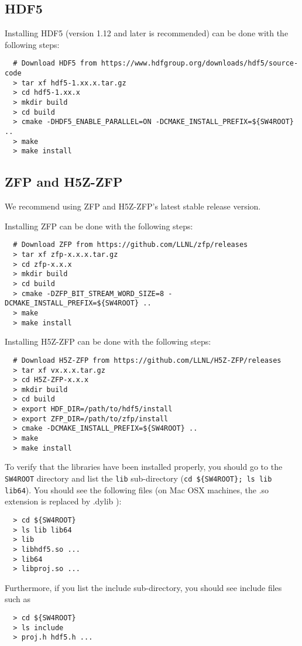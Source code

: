 \documentclass[11pt]{article}
\begin{document}
\subsection{HDF5}
Installing HDF5 (version 1.12 and later is recommended) can be done with the following steps:
\begin{verbatim}
  # Download HDF5 from https://www.hdfgroup.org/downloads/hdf5/source-code
  > tar xf hdf5-1.xx.x.tar.gz
  > cd hdf5-1.xx.x
  > mkdir build
  > cd build
  > cmake -DHDF5_ENABLE_PARALLEL=ON -DCMAKE_INSTALL_PREFIX=${SW4ROOT} ..
  > make
  > make install
\end{verbatim}

\subsection{ZFP and H5Z-ZFP}
We recommend using ZFP and H5Z-ZFP's latest stable release version. 

Installing ZFP can be done with the following steps:
\begin{verbatim}
  # Download ZFP from https://github.com/LLNL/zfp/releases
  > tar xf zfp-x.x.x.tar.gz
  > cd zfp-x.x.x
  > mkdir build
  > cd build
  > cmake -DZFP_BIT_STREAM_WORD_SIZE=8 -DCMAKE_INSTALL_PREFIX=${SW4ROOT} ..
  > make
  > make install
\end{verbatim}

Installing H5Z-ZFP can be done with the following steps:
\begin{verbatim}
  # Download H5Z-ZFP from https://github.com/LLNL/H5Z-ZFP/releases
  > tar xf vx.x.x.tar.gz
  > cd H5Z-ZFP-x.x.x
  > mkdir build
  > cd build
  > export HDF_DIR=/path/to/hdf5/install
  > export ZFP_DIR=/path/to/zfp/install
  > cmake -DCMAKE_INSTALL_PREFIX=${SW4ROOT} ..
  > make
  > make install
\end{verbatim}

To verify that the libraries have been installed properly, you should go to the \verb+SW4ROOT+
directory and list the {\tt lib} sub-directory (\verb+cd ${SW4ROOT}; ls lib lib64+). You should see the
following files (on Mac OSX machines, the .so extension is replaced by .dylib ):
\begin{verbatim}
  > cd ${SW4ROOT}
  > ls lib lib64
  > lib
  > libhdf5.so ...
  > lib64
  > libproj.so ...
\end{verbatim}

Furthermore, if you list the include sub-directory, you should see include files such as 
\begin{verbatim}
  > cd ${SW4ROOT}
  > ls include
  > proj.h hdf5.h ...
\end{verbatim}
\end{document}
